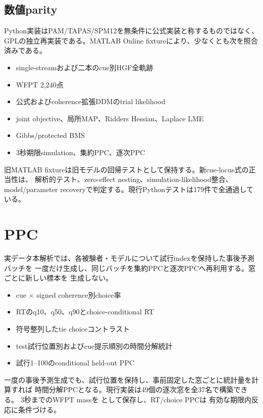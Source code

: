 \documentclass[11pt]{ltjsarticle}
\newcommand{\code}[1]{\texttt{\detokenize{#1}}}
\begin{document}
\subsection{数値parity}

Python実装はPAM/TAPAS/SPM12を無条件に公式実装と称するものではなく、
GPLの独立再実装である。MATLAB Online fixtureにより、少なくとも次を照合済みである。

\begin{itemize}
  \item single-streamおよび二本のcue別HGF全軌跡
  \item WFPT 2,240点
  \item 公式およびcoherence拡張DDMのtrial likelihood
  \item joint objective、局所MAP、Ridders Hessian、Laplace LME
  \item Gibbs/protected BMS
  \item 3秒期限simulation、集約PPC、逐次PPC
\end{itemize}

旧MATLAB fixtureは旧モデルの回帰テストとして保持する。新cue-locus式の正当性は、
解析的テスト、zero-effect nesting、simulation-likelihood整合、
model/parameter recoveryで判定する。現行Pythonテストは179件で全通過している。

\section{PPC}

実データ本解析では、各被験者・モデルについて試行indexを保持した事後予測バッチを
一度だけ生成し、同じバッチを集約PPCと逐次PPCへ再利用する。窓ごとに新しい標本を
生成しない。

\begin{itemize}
  \item cue \(\times\) signed coherence別choice率
  \item RTのq10、q50、q90とchoice-conditional RT
  \item 符号整列したtie choiceコントラスト
  \item test試行位置別およびcue提示順別の時間分解統計
  \item 試行1--100のconditional held-out PPC
\end{itemize}

一度の事後予測生成でも、試行位置を保持し、事前固定した窓ごとに統計量を計算すれば
時間分解PPCとなる。現行実装は49個の逐次窓を全37名で構築できる。
3秒までのWFPT massを \code{captured_mass} として保存し、RT/choice PPCは
有効な期限内反応に条件づける。
\end{document}
